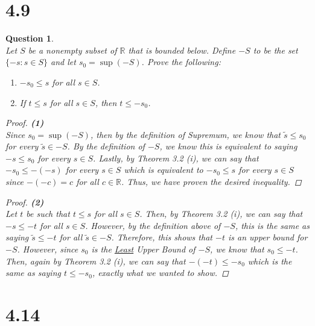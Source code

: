 \documentclass[10pt,a4paper]{article}
\newtheorem*{question*}{Question}
\theoremstyle{definition}
\begin{document}
\section*{4.9}

\begin{question*}{$ $}
\\Let $S$ be a nonempty subset of $\mathbb{R}$ that is bounded below. Define $-S$ to be the set $\{-s: s \in S\}$ and let $s_0 = \sup(-S)$. Prove the following:
\begin{enumerate}[label = (\arabic*)]
\item $-s_0 \leq s$ for all $s \in S$.
\item If $t \leq s$ for all $s \in S$, then $t \leq -s_0$. 
\end{enumerate}

\begin{proof}{\textbf{(1)}}
\\Since $s_0 = \sup(-S)$, then by the definition of Supremum, we know that $\tilde{s} \leq s_0$ for every $\tilde{s} \in -S$. By the definition of $-S$, we know this is equivalent to saying $-s \leq s_0$ for every $s \in S$. Lastly, by Theorem 3.2 (i), we can say that $-s_0 \leq -(-s)$ for every $s \in S$ which is equivalent to $-s_0 \leq s$ for every $s \in S$ since $-(-c) = c$ for all $c \in \mathbb{R}$. Thus, we have proven the desired inequality. 
\end{proof}

\begin{proof}{\textbf{(2)}}
\\Let $t$ be such that $t \leq s$ for all $s \in S$. Then, by Theorem 3.2 (i), we can say that $-s \leq -t$ for all $s \in S$. However, by the definition above of $-S$, this is the same as saying $\tilde{s} \leq -t$ for all $\tilde{s} \in -S$. Therefore, this shows that $-t$ is an upper bound for $-S$. However, since $s_0$ is the \underline{Least} Upper Bound of $-S$, we know that $s_0 \leq -t$. Then, again by Theorem 3.2 (i), we can say that $-(-t) \leq -s_0$ which is the same as saying $t \leq -s_0$, exactly what we wanted to show. 
\end{proof}

\end{question*}

\section*{4.14}
\end{document}
